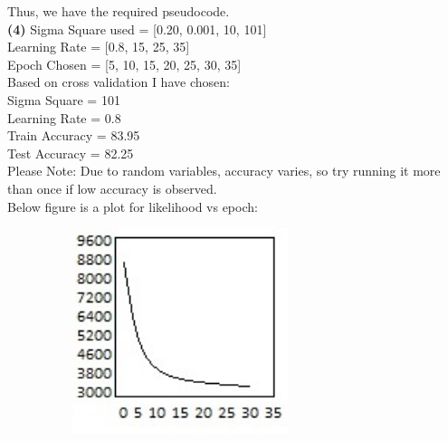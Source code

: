 \documentclass[11pt]{article}
\renewcommand\part[1]{\vspace{.10in}\textbf{(#1)}}
\begin{document}
Thus, we have the required pseudocode.\\

\part{4}
Sigma Square used = [0.20, 0.001, 10, 101]\\
Learning Rate = [0.8, 15, 25, 35]\\
Epoch Chosen = [5, 10, 15, 20, 25, 30, 35]\\
Based on cross validation I have chosen:\\
Sigma Square = 101\\
Learning Rate = 0.8\\
Train Accuracy = 83.95\\
Test Accuracy = 82.25\\
Please Note: Due to random variables, accuracy varies, so try running it more than once if low accuracy is observed.\\

Below figure is a plot for likelihood vs epoch:\\
\begin{figure}[h]
   \centering
  \includegraphics[width=8cm, height=6cm]{ML.jpg}
\end{figure}
\end{document}
